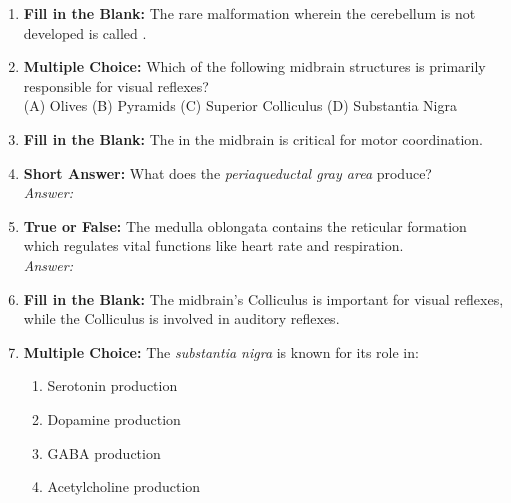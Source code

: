 \begin{enumerate}[label=\textbf{Q1.9.\arabic*}]
      \item \textbf{Fill in the Blank:} The rare malformation wherein the cerebellum is not developed is called \underline{\hspace{3cm}}. \\

      \item \textbf{Multiple Choice:} Which of the following midbrain structures is primarily responsible for visual reflexes? \\
            (A) Olives \quad (B) Pyramids \quad (C) Superior Colliculus \quad (D) Substantia Nigra \\

      \item \textbf{Fill in the Blank:} The \underline{\hspace{3cm}} in the midbrain is critical for motor coordination. \\

      \item \textbf{Short Answer:} What does the \textit{periaqueductal gray area} produce? \\
            \textit{Answer:} \\%

      \item \textbf{True or False:} The medulla oblongata contains the reticular formation which regulates vital functions like heart rate and respiration. \\
            \textit{Answer:} %

      \item \textbf{Fill in the Blank:} The midbrain’s \underline{\hspace{3cm}} Colliculus is important for visual reflexes, while the \underline{\hspace{3cm}} Colliculus is involved in auditory reflexes.

      \item \textbf{Multiple Choice:} The \textit{substantia nigra} is known for its role in:
            \begin{enumerate}[label=(\Alph*)]
                  \item Serotonin production
                  \item Dopamine production
                  \item GABA production
                  \item Acetylcholine production
            \end{enumerate}
\end{enumerate}


